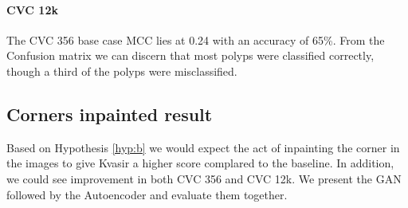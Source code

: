 \paragraph{CVC 12k}
The CVC 356 base case MCC lies at 0.24 with an accuracy of 65\%. 
From the Confusion matrix we can discern that most polyps were classified correctly, though a third of the polyps were misclassified.






\subsection{Corners inpainted result}
Based on Hypothesis \ref{hyp:b} we would expect the act of inpainting the corner in the images to give Kvasir a higher score complared to the baseline. In addition, we could see improvement in both CVC 356 and CVC 12k.
We present the GAN followed by the Autoencoder and evaluate them together.


